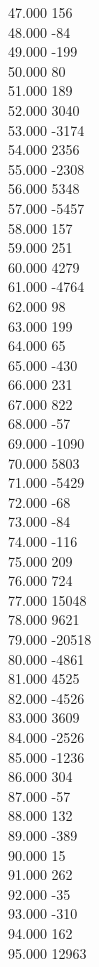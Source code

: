 { 47.000	156 \\
 48.000	-84 \\
 49.000	-199 \\
 50.000	80 \\
 51.000	189 \\
 52.000	3040 \\
 53.000	-3174 \\
 54.000	2356 \\
 55.000	-2308 \\
 56.000	5348 \\
 57.000	-5457 \\
 58.000	157 \\
 59.000	251 \\
 60.000	4279 \\
 61.000	-4764 \\
 62.000	98 \\
 63.000	199 \\
 64.000	65 \\
 65.000	-430 \\
 66.000	231 \\
 67.000	822 \\
 68.000	-57 \\
 69.000	-1090 \\
 70.000	5803 \\
 71.000	-5429 \\
 72.000	-68 \\
 73.000	-84 \\
 74.000	-116 \\
 75.000	209 \\
 76.000	724 \\
 77.000	15048 \\
 78.000	9621 \\
 79.000	-20518 \\
 80.000	-4861 \\
 81.000	4525 \\
 82.000	-4526 \\
 83.000	3609 \\
 84.000	-2526 \\
 85.000	-1236 \\
 86.000	304 \\
 87.000	-57 \\
 88.000	132 \\
 89.000	-389 \\
 90.000	15 \\
 91.000	262 \\
 92.000	-35 \\
 93.000	-310 \\
 94.000	162 \\
 95.000	12963 \\
}
